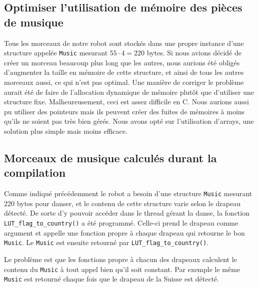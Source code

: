 \documentclass{article}
\begin{document}
    \subsection{Optimiser l'utilisation de mémoire des pièces de musique}
    Tous les morceaux de notre robot sont stockés dans une propre instance d'une structure appelée \texttt{Music} mesurant $55 \cdot 4 = 220$ bytes. 
    Si nous avions décidé de créer un morceau beaucoup plus long que les autres, nous aurions été obligés d'augmenter la taille en mémoire de cette structure, et ainsi de tous les autres morceaux aussi, ce qui n'est pas optimal. 
    Une manière de corriger le problème aurait été de faire de l'allocation dynamique de mémoire plutôt que d'utiliser une structure fixe. 
    Malheureusement, ceci est assez difficile en C. 
    Nous aurions aussi pu utiliser des pointeurs mais ils peuvent créer des fuites de mémoires à moins qu'ils ne soient pas très bien gérés. 
    Nous avons opté sur l'utilisation d'arrays, une solution plus simple mais moins efficace.
    
    \subsection{Morceaux de musique calculés durant la compilation}
    Comme indiqué précédemment le robot a besoin d'une structure \texttt{Music} mesurant 220 bytes pour danser, et le contenu de cette structure varie selon le drapeau détecté.
    De sorte d'y pouvoir accéder dans le thread gérant la danse, la fonction \texttt{LUT\_flag\_to\_country()} a été programmé.
    Celle-ci prend le drapeau comme argument et appelle une fonction propre à chaque drapeau qui retourne le bon \texttt{Music}.
    Le \texttt{Music} est ensuite retourné par \texttt{LUT\_flag\_to\_country()}.
    
    Le problème est que les fonctions propre à chacun des drapeaux calculent le contenu du \texttt{Music} à tout appel bien qu'il soit constant.
    Par exemple le même \texttt{Music} est retourné chaque fois que le drapeau de la Suisse est détecté.
    
    
\end{document}

